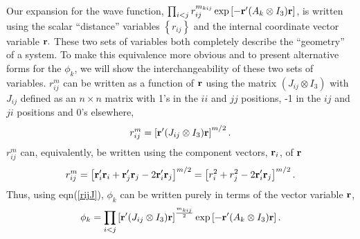 {{Our expansion for the wave function, $\prod_{i<j}r_{ij}^{m_{kij}}\exp
\left[ -{\bf r}^{\prime }(A_k\otimes I_3){\bf r}\right] $, is written
using the scalar ``distance'' variables $\left\{ r_{ij}\right\} $ and the
internal coordinate vector variable ${\bf r.}$ These two sets of
variables both completely describe the ``geometry'' of a system. To make
this equivalence more obvious and to present alternative forms for the $\phi
_k$, we will show the interchangeability of these two sets of variables. $%
r_{ij}^m$ can be written as a function of ${\bf r}$ using the matrix $%
\left( J_{ij}\otimes I_3\right) $ with $J_{ij}$ defined as an $n\times n$
matrix with 1's in the $ii$ and $jj$ positions, -1 in the $ij$ and $ji$
positions and 0's elsewhere\cite{Poshusta83,Kinghorn95a}, 
\begin{equation}
r_{ij}^m=\left[ {\bf r}^{\prime }(J_{ij}\otimes I_3){\bf r}\right]
^{m/2}.  \label{rijJ}
\end{equation}
$r_{ij}^m$ can, equivalently, be written using the component vectors, $%
{\bf r}_i$, of ${\bf r}$ 
\begin{equation}
r_{ij}^m = \left[ {\bf r}_i^{\prime }{\bf r}_i+{\bf r}_j^{\prime }%
{\bf r}_j-2{\bf r}_i^{\prime }{\bf r}_j\right] ^{m/2} 
= \left[ r_i^2+r_j^2-2{\bf r}_i^{\prime }{\bf r}_j\right] ^{m/2}.
\end{equation}
Thus, using eqn(\ref{rijJ}), $\phi _k$ can be written purely in terms of the
vector variable ${\bf r}$, 
\begin{equation}
\phi _k=\prod_{i<j}\left[ {\bf r}^{\prime }(J_{ij}\otimes I_3){\bf r}%
\right] ^{\frac{m_{kij}}2}\exp \left[ -{\bf r}^{\prime }(A_k\otimes I_3)%
{\bf r}\right] .  \label{phir}
\end{equation}

}}
